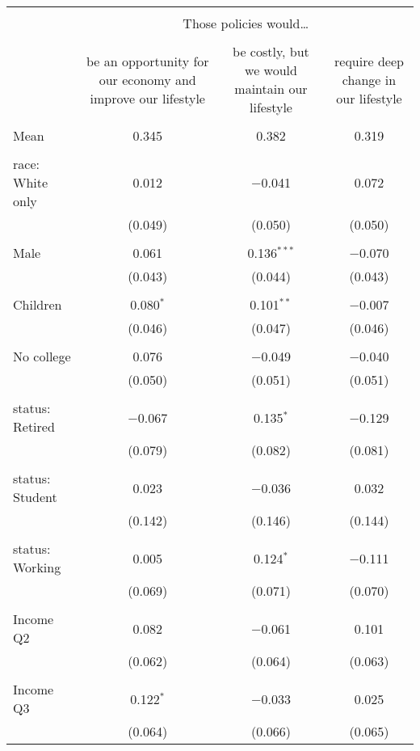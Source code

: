 
\begin{tabular}{@{\extracolsep{5pt}}lccc} 
\\[-1.8ex]\hline 
\hline \\[-1.8ex] 
 & \multicolumn{3}{c}{Those policies would…} \\ 
\cline{2-4} 
\\[-1.8ex] & be an opportunity for our economy and improve our lifestyle & be costly, but we would maintain our lifestyle & require deep change in our lifestyle \\ 
\hline \\[-1.8ex] 
 Mean & 0.345 & 0.382 & 0.319  \\ \hline \\[-1.8ex] race: White only & 0.012 & $-$0.041 & 0.072 \\ 
  & (0.049) & (0.050) & (0.050) \\ 
  & & & \\ 
 Male & 0.061 & 0.136$^{***}$ & $-$0.070 \\ 
  & (0.043) & (0.044) & (0.043) \\ 
  & & & \\ 
 Children & 0.080$^{*}$ & 0.101$^{**}$ & $-$0.007 \\ 
  & (0.046) & (0.047) & (0.046) \\ 
  & & & \\ 
 No college & 0.076 & $-$0.049 & $-$0.040 \\ 
  & (0.050) & (0.051) & (0.051) \\ 
  & & & \\ 
 status: Retired & $-$0.067 & 0.135$^{*}$ & $-$0.129 \\ 
  & (0.079) & (0.082) & (0.081) \\ 
  & & & \\ 
 status: Student & 0.023 & $-$0.036 & 0.032 \\ 
  & (0.142) & (0.146) & (0.144) \\ 
  & & & \\ 
 status: Working & 0.005 & 0.124$^{*}$ & $-$0.111 \\ 
  & (0.069) & (0.071) & (0.070) \\ 
  & & & \\ 
 Income Q2 & 0.082 & $-$0.061 & 0.101 \\ 
  & (0.062) & (0.064) & (0.063) \\ 
  & & & \\ 
 Income Q3 & 0.122$^{*}$ & $-$0.033 & 0.025 \\ 
  & (0.064) & (0.066) & (0.065) \\ 

\end{tabular}
